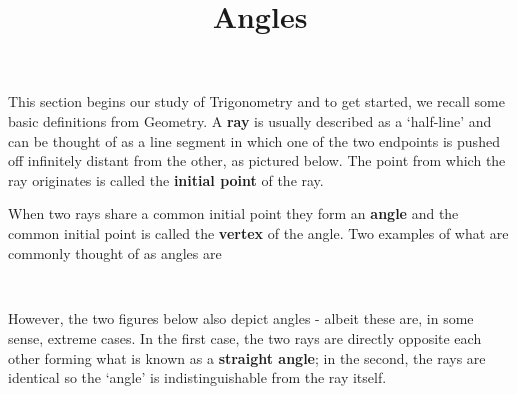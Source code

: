 \documentclass[12pt]{ximera}
\title{Angles}
\begin{document}
\setcounter{footnote}{0}

\label{Angles}

This section begins our study of Trigonometry and to get started, we recall some basic definitions from Geometry.  A  \textbf{ray} is usually described as a `half-line' and can be thought of as a line segment in which one of the two endpoints is pushed off infinitely distant from the other, as pictured below.  The point from which the ray originates is called the  \textbf{initial point} of the ray.

\begin{center}



\end{center}

When two rays share a common initial point they form an  \textbf{angle} and the common initial point is called the \textbf{vertex} of the angle.  Two  examples of what are commonly thought of as angles are

\[ \begin{array}{cc}

  

&

\hspace{1.75in}

   \\ \end{array} \]

However, the two figures below also depict angles - albeit these are, in some sense, extreme cases.  In the first case, the two rays are directly opposite each other forming what is known as a \textbf{straight angle}; in the second, the rays are identical so the `angle' is indistinguishable from the ray itself.
\end{document}
